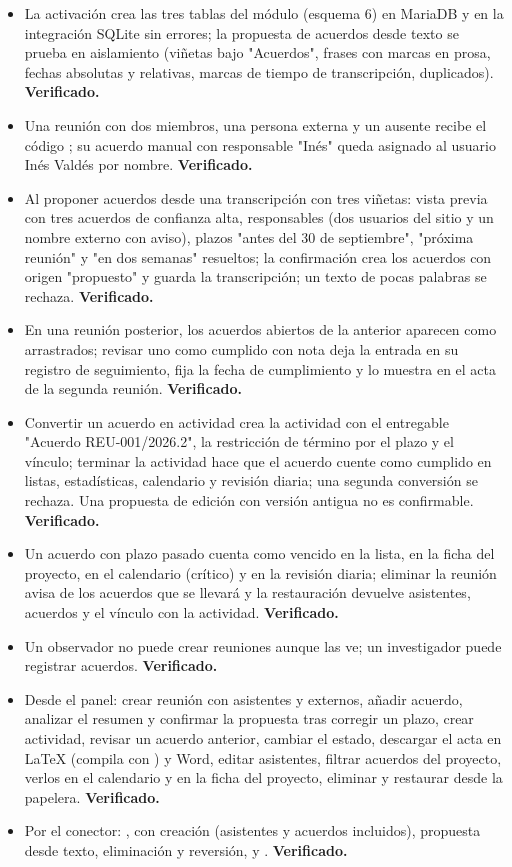 \documentclass[11pt,a4paper]{article}
\begin{document}
\begin{itemize}
\item La activación crea las tres tablas del módulo (esquema 6) en MariaDB y en la integración SQLite sin errores; la propuesta de acuerdos desde texto se prueba en aislamiento (viñetas bajo "Acuerdos", frases con marcas en prosa, fechas absolutas y relativas, marcas de tiempo de transcripción, duplicados). \textbf{Verificado.}
\item Una reunión con dos miembros, una persona externa y un ausente recibe el código ; su acuerdo manual con responsable "Inés" queda asignado al usuario Inés Valdés por nombre. \textbf{Verificado.}
\item Al proponer acuerdos desde una transcripción con tres viñetas: vista previa con tres acuerdos de confianza alta, responsables (dos usuarios del sitio y un nombre externo con aviso), plazos "antes del 30 de septiembre", "próxima reunión" y "en dos semanas" resueltos; la confirmación crea los acuerdos con origen "propuesto" y guarda la transcripción; un texto de pocas palabras se rechaza. \textbf{Verificado.}
\item En una reunión posterior, los acuerdos abiertos de la anterior aparecen como arrastrados; revisar uno como cumplido con nota deja la entrada en su registro de seguimiento, fija la fecha de cumplimiento y lo muestra en el acta de la segunda reunión. \textbf{Verificado.}
\item Convertir un acuerdo en actividad crea la actividad con el entregable "Acuerdo REU-001/2026.2", la restricción de término por el plazo y el vínculo; terminar la actividad hace que el acuerdo cuente como cumplido en listas, estadísticas, calendario y revisión diaria; una segunda conversión se rechaza. Una propuesta de edición con versión antigua no es confirmable. \textbf{Verificado.}
\item Un acuerdo con plazo pasado cuenta como vencido en la lista, en la ficha del proyecto, en el calendario (crítico) y en la revisión diaria; eliminar la reunión avisa de los acuerdos que se llevará y la restauración devuelve asistentes, acuerdos y el vínculo con la actividad. \textbf{Verificado.}
\item Un observador no puede crear reuniones aunque las ve; un investigador puede registrar acuerdos. \textbf{Verificado.}
\item Desde el panel: crear reunión con asistentes y externos, añadir acuerdo, analizar el resumen y confirmar la propuesta tras corregir un plazo, crear actividad, revisar un acuerdo anterior, cambiar el estado, descargar el acta en LaTeX (compila con ) y Word, editar asistentes, filtrar acuerdos del proyecto, verlos en el calendario y en la ficha del proyecto, eliminar y restaurar desde la papelera. \textbf{Verificado.}
\item Por el conector: ,  con creación (asistentes y acuerdos incluidos), propuesta desde texto, eliminación y reversión,  y . \textbf{Verificado.}
\end{itemize}
\end{document}

